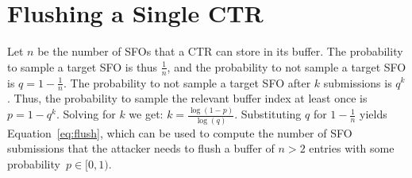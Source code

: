


\section{Flushing a Single CTR} \label{app:flush}
Let $n$ be the number of SFOs that a CTR can store in its buffer.  The
probability to sample a target SFO is thus $\frac{1}{n}$, and the probability to
not sample a target SFO is $q = 1 - \frac{1}{n}$.  The probability to not sample
a target SFO after $k$ submissions is $q^k$.  Thus, the probability to sample
the relevant buffer index at least once is $p = 1 - q^k$.  Solving for $k$ we
get: $k = \frac{\log(1 - p)}{\log(q)}$.  Substituting $q$ for $1 - \frac{1}{n}$
yields Equation~\ref{eq:flush}, which can be used to compute the number of
SFO submissions that the attacker needs to flush a buffer of $n>2$
entries with some probability~$p\in[0,1)$.

